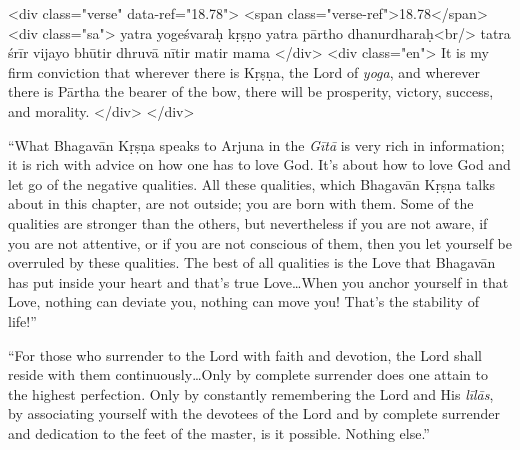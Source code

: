 \begin{html}
<div class="verse" data-ref="18.78">
  <span class="verse-ref">18.78</span>
  <div class="sa">
    yatra yogeśvaraḥ kṛṣṇo yatra pārtho dhanurdharaḥ<br/>
    tatra śrīr vijayo bhūtir dhruvā nītir matir mama
  </div>
  <div class="en">
    It is my firm conviction that wherever there is Kṛṣṇa, the Lord of \textit{yoga}, and wherever there is Pārtha the bearer of the bow, there will be prosperity, victory, success, and morality.
  </div>
</div>
\end{html}


\enquote{What Bhagavān Kṛṣṇa speaks to Arjuna in the \textit{Gītā} is very rich in information; it is rich with advice on how one has to love God. It’s about how to love God and let go of the negative qualities. All these qualities, which Bhagavān Kṛṣṇa talks about in this chapter, are not outside; you are born with them. Some of the qualities are stronger than the others, but nevertheless if you are not aware, if you are not attentive, or if you are not conscious of them, then you let yourself be overruled by these qualities. The best of all qualities is the Love that Bhagavān has put inside your heart and that’s true Love\ldots When you anchor yourself in that Love, nothing can deviate you, nothing can move you! That’s the stability of life!}

\enquote{For those who surrender to the Lord with faith and devotion, the Lord shall reside with them continuously\ldots Only by complete surrender does one attain to the highest perfection. Only by constantly remembering the Lord and His \textit{līlās}, by associating yourself with the devotees of the Lord and by complete surrender and dedication to the feet of the master, is it possible. Nothing else.}
